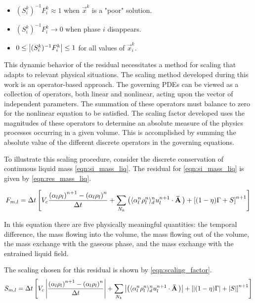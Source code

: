 \begin{itemize}
\item{$(S_{i}^{k})^{-1} F^{k}_i \approx 1$ when $\vec{x}^{k}$ is a "poor" solution.}
\item{$(S_{i}^{k})^{-1} F^{k}_i \rightarrow 0$ when phase $i$ disappears.}
\item{$0 \leq \left|(S_{i}^{k})^{-1} F^{k}_{i}\right| \leq 1 $ for all values of $\vec{x}^{k}_i$.}
\end{itemize}

This dynamic behavior of the residual necessitates a method for scaling that adapts to relevant physical situations.
The scaling method developed during this work is an operator-based approach.
The governing PDEs can be viewed as a collection of operators, both linear and nonlinear, acting upon the vector of independent parameters.
The summation of these operators must balance to zero for the nonlinear equation to be satisfied.
The scaling factor developed uses the magnitudes of these operators to determine an absolute measure of the physics processes occurring in a given volume.
This is accomplished by summing the absolute value of the different discrete operators in the governing equations. 

To illustrate this scaling procedure, consider the discrete conservation of continuous liquid mass \eqref{eqn:si_mass_liq}.
The residual for \eqref{eqn:si_mass_liq} is given by \eqref{eqn:res_mass_liq}.

\begin{equation}
\label{eqn:res_mass_liq}
F_{m,l} = \Delta t \left[ V_c \frac{\left(\alpha_l \rho_l \right)^{n+1} - \left(\alpha_l \rho_l \right)^{n}}{\Delta t} + \sum_{N_{k}}\left( \don{\alpha^n_l \rho^n_l}^{n}_{d} u^{n+1}_l  \cdot \vec{\bar{A}}\right) + \left[(1-\eta)\Gamma + S \right]^{n+1}\right]
\end{equation}

In this equation there are five physically meaningful quantities: the temporal difference, the mass flowing into the volume, the mass flowing out of the volume, the mass exchange with the gaseous phase, and the mass exchange with the entrained liquid field.

The scaling chosen for this residual is shown by \eqref{eqn:scaling_factor}.
\begin{equation}
\label{eqn:scaling_factor}
S_{m,l} = \Delta t \left[ V_c \abs{\frac{\left(\alpha_l \rho_l \right)^{n+1} - \left(\alpha_l \rho_l \right)^{n}}{\Delta t}} + \sum_{N_{k}}\abs{\left( \don{\alpha^n_l \rho^n_l}^{n}_{d} u^{n+1}_l  \cdot \vec{\bar{A}}\right)} + \left[\abs{(1-\eta)\Gamma} + \abs{S} \right]^{n+1}\right]
\end{equation}

